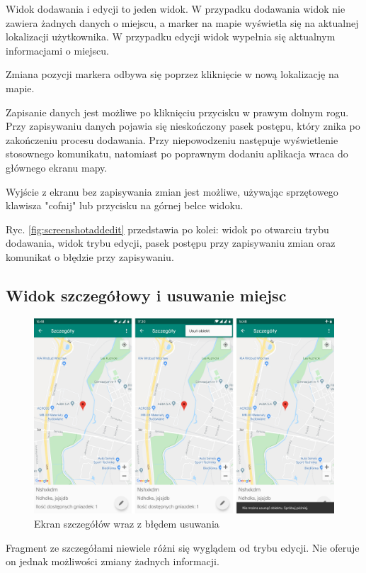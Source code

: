 \documentclass[polish,polish,a4paper,12pt]{article}
\begin{document}
	Widok dodawania i edycji to jeden widok. W przypadku dodawania widok nie zawiera żadnych danych o miejscu, a marker na mapie wyświetla się na aktualnej lokalizacji użytkownika. W przypadku edycji widok wypełnia się aktualnym informacjami o miejscu.

	Zmiana pozycji markera odbywa się poprzez kliknięcie w nową lokalizację na mapie.

	Zapisanie danych jest możliwe po kliknięciu przycisku w prawym dolnym rogu. Przy zapisywaniu danych pojawia się nieskończony pasek postępu, który znika po zakończeniu procesu dodawania. Przy niepowodzeniu następuje wyświetlenie stosownego komunikatu, natomiast po poprawnym dodaniu aplikacja wraca do głównego ekranu mapy.

	Wyjście z ekranu bez zapisywania zmian jest możliwe, używając sprzętowego klawisza "cofnij" lub przycisku na górnej belce widoku.

	Ryc. \ref{fig:screenshotaddedit} przedstawia po kolei: widok po otwarciu trybu dodawania, widok trybu edycji, pasek postępu przy zapisywaniu zmian oraz komunikat o błędzie przy zapisywaniu.

	\subsection{Widok szczegółowy i usuwanie miejsc}

	\begin{figure}[H]
		\centering
		\includegraphics[width = \textwidth]{screenshot-detail}
		\caption{Ekran szczegółów wraz z błędem usuwania}
		\label{fig:screenshotdetail}
	\end{figure}

	Fragment ze szczegółami niewiele różni się wyglądem od trybu edycji. Nie oferuje on jednak możliwości zmiany żadnych informacji.
\end{document}
